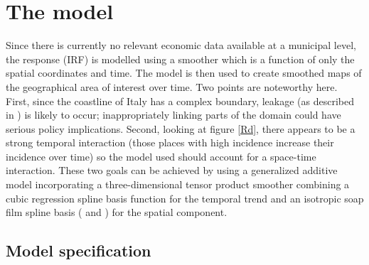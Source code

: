 \section{The model \label{METH}}

Since there is currently no relevant economic data available at a municipal level, the response (IRF) is modelled using a smoother which is a function of only the spatial coordinates and time. The model is then used to create smoothed maps of the geographical area of interest over time. Two points are noteworthy here. First, since the coastline of Italy has a complex boundary, leakage (as described in ) is likely to occur; inappropriately linking parts of the domain could have serious policy implications. Second, looking at figure \ref{Rd}, there appears to be a strong temporal interaction (those places with high incidence increase their incidence over time) so the model used should account for a space-time interaction. These two goals can be achieved by using a generalized additive model incorporating a three-dimensional tensor product smoother combining a cubic regression spline basis function for the temporal trend and an isotropic soap film spline basis (\cite{soap} and ) for the spatial component.

\subsection{Model specification \label{MS}}

